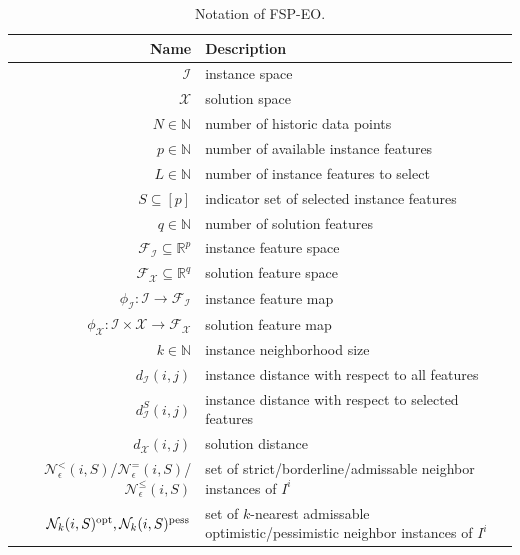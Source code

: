 \documentclass[11pt, a4paper]{article}
\newcommand{\fspeo}{FSP-EO\xspace}
\newcommand{\I}{{\mathcal{I}}} %
\newcommand{\X}{{\mathcal{X}}} %
\newcommand{\F}{{\mathcal{F}}} %
\newcommand{\instfeaturespace}{\F_\I} %
\newcommand{\instance}{I}
\newcommand{\solution}{x}
\newcommand{\instanceindex}{i}
\newcommand{\instanceindextwo}{j}
\newcommand{\solfeaturemap}[1][(\instance^\instanceindex,\solution^\instanceindex)]{\phi_\X#1} %
\newcommand{\fsel}{S} %
\newcommand{\selectionset}{\fsel}
\newcommand{\x}{{x}}
\newcommand{\instdist}[1][(\instance^\instanceindex,\instance^\instanceindextwo)]{{d_{\fsel}#1}} %
\newcommand{\instdistvector}[1][(\instance^\instanceindex)]{{d_{\fsel}#1}}
\newcommand{\soldist}[1][(\instanceindex,\instanceindextwo)]{d_\X#1} %
\newcommand{\distancek}[1][(\instance^\instanceindex)]{d^{\fsel,(k)}#1} %
\newcommand{\neighbour}{\ensuremath{\mathcal{N}}}
\newcommand{\sEpsStrict}[1][(\instanceindex,\selectionset)]{\ensuremath{\neighbour^<_\epsilon#1}}
\newcommand{\sEpsBorder}[1][(\instanceindex,\selectionset)]{\ensuremath{\neighbour^=_\epsilon#1}}
\newcommand{\sEpsNeighbour}[1][(\instanceindex,\selectionset)]{\ensuremath{\neighbour^\le_\epsilon#1}}
\newcommand{\skGen}[1][(\instanceindex,\selectionset)]{\neighbour_k#1}
\begin{document}
\begin{table}[htbp]
\centering
\caption{Notation of \fspeo.}\label{table:sets_params_vars}
\begin{tabular}{r|p{}}
\textbf{Name} & \textbf{Description} \\
\hline
$\I$ & instance space \\
$\X$ & solution space\\
$N \in \mathbb{N}$ & number of historic data points  \\
\hline
$p \in \mathbb{N}$ & number of available instance features \\
$L \in \mathbb{N}$ & number of instance features to select \\
$ \selectionset \subseteq [p] $ & indicator set of selected instance features \\
$q \in \mathbb{N}$ &number of solution features \\
$\instfeaturespace \subseteq \mathbb{R}^p$ & instance feature space \\
$\F_\X \subseteq \mathbb{R}^q$ & solution feature space \\
$\phi_\I : \I \to \F_\I$ & instance feature map \\
$\phi_\X : \I \times \X \to \F_\X$ & solution feature map \\
$k \in \mathbb{N}$ & instance neighborhood size \\
$d_{\I}(i, j)$
& instance distance with respect to all features \\
$d_{\mathcal{I}}^{\selectionset}(i,j)$
& instance  distance with respect to selected features \\
$\soldist$
& solution  distance \\
\hline
$\sEpsStrict$/$\sEpsBorder$/$\sEpsNeighbour$   & set of strict/borderline/admissable neighbor instances of $I^i$\\
$\skGen^{\textnormal{opt}}, \skGen^{\textnormal{pess}}$ & set of $k$-nearest admissable optimistic/pessimistic neighbor instances of  $I^i$
\end{tabular}
\end{table}
\end{document}
